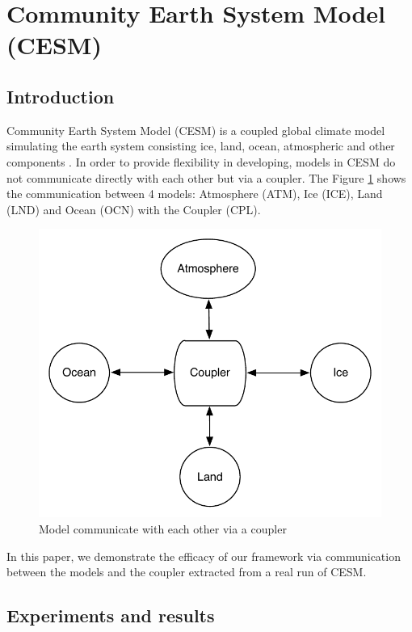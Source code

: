 \section{Community Earth System Model (CESM)}
\label{sec:cesm}

\subsection{Introduction}

Community Earth System Model (CESM) is a coupled global climate model simulating the earth system consisting ice, land, ocean, atmospheric and other components \cite{CESM:Hurrell}. In order to provide flexibility in developing, models in CESM do not communicate directly with each other but via a coupler. The Figure \ref{fig:mct} shows the communication between 4 models: Atmosphere (ATM), Ice (ICE), Land (LND) and Ocean (OCN) with the Coupler (CPL).

\begin{figure}[!htb]
\vspace{-0.1in}
\centering
\includegraphics[scale=0.5]{figures/mct.pdf}
\vspace{-0.1in}
\caption{Model communicate with each other via a coupler}
\vspace{-0.1in}
\label{fig:mct}
\end{figure}

In this paper, we demonstrate the efficacy of our framework via communication between the models and the coupler extracted from a real run of CESM.

\subsection{Experiments and results}




